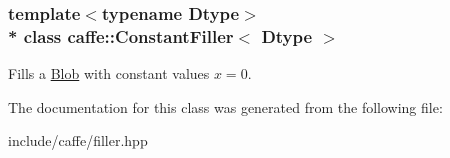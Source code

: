 \subsubsection*{template$<$typename Dtype$>$\\*
class caffe\+::\+Constant\+Filler$<$ Dtype $>$}

Fills a \hyperlink{classcaffe_1_1Blob}{Blob} with constant values $ x = 0 $. 

The documentation for this class was generated from the following file\+:\begin{DoxyCompactItemize}
\item 
include/caffe/filler.\+hpp\end{DoxyCompactItemize}

